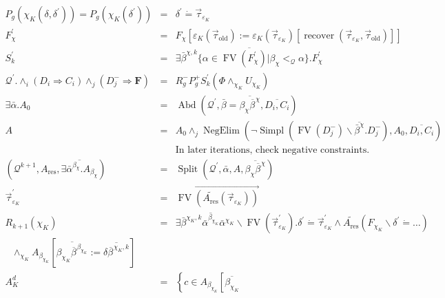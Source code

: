\documentclass{article}
\newcommand{\assign}{:=}
\newcommand{\tmmathbf}[1]{\ensuremath{\boldsymbol{#1}}}
\newcommand{\tmop}[1]{\ensuremath{\operatorname{#1}}}
\begin{document}
\begin{eqnarray}
  P_g (\chi_K (\delta, \delta^{\prime})) = P_g (\chi_K (\delta^{\prime})) & =
  & \delta^{\prime} \dot{=} \vec{\tau}_{\varepsilon_K} \nonumber\\
  F_{\chi}^{\prime} & = & F_{\chi} [\varepsilon_K (\vec{\tau}_{\tmop{old}})
  \assign \varepsilon_K (\vec{\tau}_{\varepsilon_K}) [\tmop{recover}
  (\vec{\tau}_{\varepsilon_K}, \vec{\tau}_{\tmop{old}})]] \nonumber\\
  S_k^{\prime} & = & \overline{\exists \bar{\beta}^{\chi, k} \{ \alpha \in
  \tmop{FV} (F^{\prime}_{\chi}) | \beta_{\chi} <_{\mathcal{Q}} \alpha \}
  .F^{\prime}_{\chi}^{}}  \label{CaptureEscParams}\\
  \mathcal{Q}^{\prime} . \wedge_i (D_i \Rightarrow C_i) \wedge_j (D_j^-
  \Rightarrow \tmmathbf{F}) & = & R_g^- P_g^+ S_k^{\prime} (\Phi
  \wedge_{\chi_K} U_{\chi_K}) \nonumber\\
  \exists \bar{\alpha} .A_0 & = & \tmop{Abd} \left( \mathcal{Q}^{\prime},
  \bar{\beta} = \overline{\beta_{\chi} \overline{\beta^{}}^{\chi}},
  \overline{D_i, C_i} \right) \\
  A & = & A_0 \wedge_j \tmop{NegElim} (\neg \tmop{Simpl} (\tmop{FV} (D_j^-)
  \backslash \overline{\bar{\beta}^{\chi}} .D_j^-), A_0, \overline{D_i, C_i})
  \nonumber\\
  &  & \text{In later iterations, check negative constraints.} \\
  \left( \mathcal{Q}^{k + 1}, A_{\tmop{res}}, \overline{\exists
  \bar{\alpha}^{\beta_{\chi}} .A_{\beta_{\chi}}} \right) & = & \tmop{Split}
  \left( \mathcal{Q}^{\prime}, \bar{\alpha}, A, \overline{\beta_{\chi}
  \overline{\beta^{}}^{\chi}} \right) \nonumber\\
  \vec{\tau}_{\varepsilon_K}^{\prime} & = & \overrightarrow{\tmop{FV}
  (\widetilde{A_{\tmop{res}}} (\vec{\tau}_{\varepsilon_K}))} \nonumber\\
  R_{k + 1} (\chi_K) & = & \exists \bar{\beta}^{\chi_K, k}
  \overline{\bar{\alpha}^{\beta_{\chi_K}}} \bar{\alpha}^{\chi_K} \backslash
  \tmop{FV} (\vec{\tau}_{\varepsilon_K}^{\prime}) . \delta^{\prime} \dot{=}
  \vec{\tau}_{\varepsilon_K}^{\prime} \wedge \widetilde{A_{\tmop{res}}}
  (F_{\chi_K} \backslash \delta^{\prime} \dot{=} \ldots) \\
  \text{ \ \ \ } \wedge_{\chi_K} A_{\beta_{\chi_K}} \left[
  \overline{\beta_{\chi_K} \overline{\beta^{}}^{\beta_{\chi_K}}} \assign
  \overline{\delta \overline{\beta^{}}^{\chi_K, k}} \right] \\
  A_K^d & = & \left\{ c \in A_{\beta_{\chi_K}} \left[ \overline{\beta_{\chi_K}
}
\end{eqnarray}
\end{document}
